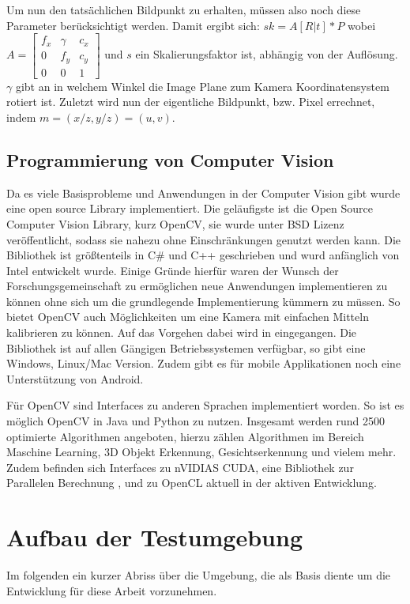 Um nun den tatsächlichen Bildpunkt zu erhalten, müssen also noch diese Parameter berücksichtigt werden. Damit ergibt sich:
$sk = A [R | t] * P 
$
wobei $A = \begin{bmatrix} f_x & \gamma & c_x \\
                             0 &  f_y   & c_y \\
                             0 &  0     &  1\end{bmatrix}$ und $s$ ein Skalierungsfaktor ist, abhängig von der Auflösung. $\gamma$ gibt an in welchem Winkel die Image Plane zum Kamera Koordinatensystem rotiert ist. Zuletzt wird nun der eigentliche Bildpunkt, bzw. Pixel errechnet, indem $m=(x/z, y/z)=(u,v)$.



\subsection{Programmierung von Computer Vision}
Da es viele Basisprobleme und Anwendungen in der Computer Vision gibt wurde eine open source Library implementiert. Die geläufigste ist die Open Source Computer Vision Library, kurz OpenCV, sie wurde unter BSD Lizenz veröffentlicht, sodass sie nahezu ohne Einschränkungen genutzt werden kann. Die Bibliothek ist größtenteils in C\# und C++  geschrieben und wurd anfänglich von Intel entwickelt wurde. \textbf{\autocite[512--]{Medioni:2004:ETC:993884} }Einige Gründe hierfür waren der Wunsch der Forschungsgemeinschaft zu ermöglichen neue Anwendungen implementieren zu können ohne sich um die grundlegende Implementierung kümmern zu müssen. So bietet OpenCV auch Möglichkeiten um eine Kamera mit einfachen Mitteln kalibrieren zu können. Auf das Vorgehen dabei wird in  eingegangen.
Die Bibliothek ist auf allen Gängigen Betriebssystemen verfügbar, so gibt eine Windows, Linux/Mac Version. Zudem gibt es für mobile Applikationen noch eine Unterstützung von Android.

Für OpenCV sind Interfaces zu anderen Sprachen implementiert worden. So ist es möglich OpenCV in Java und Python zu nutzen. \autocite{OpenCV2016} Insgesamt werden rund 2500 optimierte Algorithmen angeboten, hierzu zählen Algorithmen im Bereich Maschine Learning, 3D Objekt Erkennung, Gesichtserkennung und vielem mehr. Zudem befinden sich Interfaces zu nVIDIAS CUDA, eine Bibliothek zur Parallelen Berechnung \autocite{cuda2017}, und zu OpenCL aktuell in der aktiven Entwicklung.


\section{Aufbau der Testumgebung}
\label{sec:setup}
Im folgenden ein kurzer Abriss über die Umgebung, die als Basis diente um die Entwicklung für diese Arbeit vorzunehmen. 




